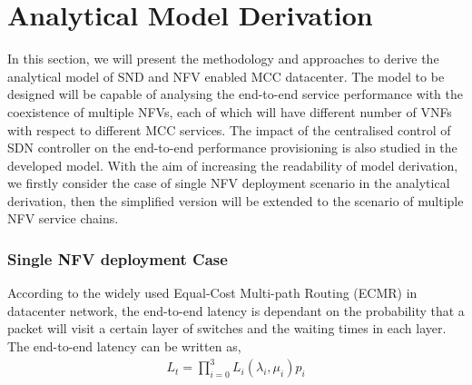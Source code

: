 
\section{Analytical Model Derivation}
\label{sec:analytical_model}

In this section, we will present the methodology and approaches to derive the analytical model of SND and NFV enabled MCC datacenter. The model to be designed will be capable of analysing the end-to-end service performance with the coexistence of multiple NFVs, each of which will have different number of VNFs with respect to different MCC services. The impact of the centralised control of SDN controller on the end-to-end performance provisioning is also studied in the developed model. With the aim of increasing the readability of model derivation, we firstly consider the case of single NFV deployment scenario in the analytical derivation, then the simplified version will be extended to the scenario of multiple NFV service chains. 

\subsubsection{Single NFV deployment Case}

According to the widely used Equal-Cost Multi-path Routing (ECMR) \cite{Chiesa} in datacenter network, the end-to-end latency is dependant on the probability that a packet will visit a certain layer of switches and the waiting times in each layer. The end-to-end latency can be written as, 
\begin{equation} 
\label{eq:mean_latency}
\begin{split}
{ L }_{ t }=\prod _{ i=0 }^{ 3 }{ { L }_{ i }({ \lambda  }_{ i },\mu _{ i }){ p }_{ i } } 
\end{split}
\end{equation}

